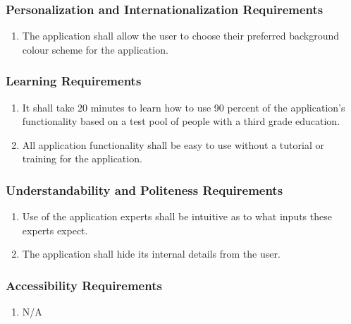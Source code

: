\documentclass[titlepage]{article}
\begin{document}
\subsubsection{Personalization and Internationalization Requirements}
\label{ssub:personalization_and_internationalization_requirements}
\begin{enumerate}[{UH}1. ]
	\item The application shall allow the user to choose their preferred background colour scheme for the application. 
\end{enumerate}

\subsubsection{Learning Requirements}
\label{ssub:learning_requirements}
\begin{enumerate}[{UH}1. ]
	\item It shall take 20 minutes to learn how to use 90 percent of the application's functionality based on a test pool of people with a third grade education.
	
	\item All application functionality shall be easy to use without a tutorial or training for the application.
	

\end{enumerate}

\subsubsection{Understandability and Politeness Requirements}
\label{ssub:understandability_and_politeness_requirements}
\begin{enumerate}[{UH}1. ]
	\item Use of the application experts shall be intuitive as to what inputs these experts expect.

	\item The application shall hide its internal details from the user. 
\end{enumerate}

\subsubsection{Accessibility Requirements}
\label{ssub:accessibility_requirements}
\begin{enumerate}[{UH}1. ]
	\item N/A
\end{enumerate}
\end{document}
